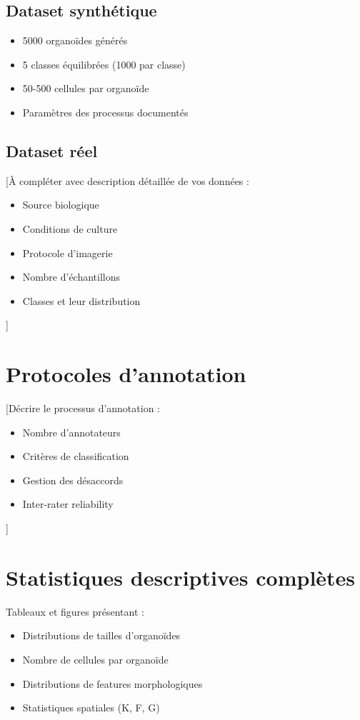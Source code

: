 \subsection{Dataset synthétique}
\begin{itemize}
    \item 5000 organoïdes générés
    \item 5 classes équilibrées (1000 par classe)
    \item 50-500 cellules par organoïde
    \item Paramètres des processus documentés
\end{itemize}

\subsection{Dataset réel}
[À compléter avec description détaillée de vos données :
\begin{itemize}
    \item Source biologique
    \item Conditions de culture
    \item Protocole d'imagerie
    \item Nombre d'échantillons
    \item Classes et leur distribution
\end{itemize}
]

\section{Protocoles d'annotation}

[Décrire le processus d'annotation :
\begin{itemize}
    \item Nombre d'annotateurs
    \item Critères de classification
    \item Gestion des désaccords
    \item Inter-rater reliability
\end{itemize}
]

\section{Statistiques descriptives complètes}

Tableaux et figures présentant :
\begin{itemize}
    \item Distributions de tailles d'organoïdes
    \item Nombre de cellules par organoïde
    \item Distributions de features morphologiques
    \item Statistiques spatiales (K, F, G)
\end{itemize}

